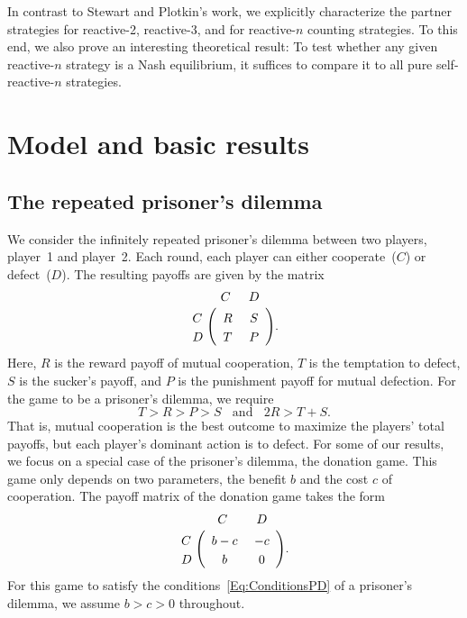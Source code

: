 \documentclass[9pt,twoside,lineno]{pnas-new}
\theoremstyle{plainCl1}
\theoremstyle{plainCl2}
\begin{document}
In contrast to Stewart and Plotkin's work, we explicitly characterize the partner strategies for reactive-2, reactive-3, and for reactive-$n$ counting strategies. 
To this end, we also prove an interesting theoretical result: 
To test whether any given reactive-$n$ strategy is a Nash equilibrium, it suffices to compare it to all pure self-reactive-$n$ strategies. 





\section{Model and basic results}\label{section:model}

\subsection{The repeated prisoner's dilemma}


We consider the infinitely repeated prisoner's dilemma between two players, player~1 and player~2.
Each round, each player can either cooperate~($C$) or defect~($D$). 
The resulting payoffs are given by the matrix 
\begin{align}\label{Eq:PrisonerDilemma}
  \bordermatrix{%
    & C & D \cr
    C &\ R &\ S\  \cr
    D &\ T &\ P\ \cr
  }.
\end{align}
Here, $R$ is the reward payoff of mutual cooperation, $T$ is the temptation to defect, $S$ is the sucker's payoff, and $P$ is the punishment payoff for mutual defection. For the game to be a prisoner's dilemma, we require
\begin{equation} \label{Eq:ConditionsPD}
 T > R > P > S ~~~~\text{and}~~~~ 2 R > T \!+\! S. 
\end{equation}
That is, mutual cooperation is the best outcome to maximize the players' total payoffs, but each player's dominant action is to defect. 
For some of our results, we focus on a special case of the prisoner's dilemma, the donation game. 
This game only depends on two parameters, the benefit $b$ and the cost $c$ of cooperation. 
The payoff matrix of the donation game takes the form
\begin{align} \label{Eq:DonationGame}
  \bordermatrix{%
    & C & D \cr
    C &\ b - c &\ -c\  \cr
    D &\ b &\ 0\ \cr
  }.
\end{align}
For this game to satisfy the conditions~\eqref{Eq:ConditionsPD} of a prisoner's dilemma, we assume $b\!>\!c\!>\!0$ throughout. 
\end{document}
